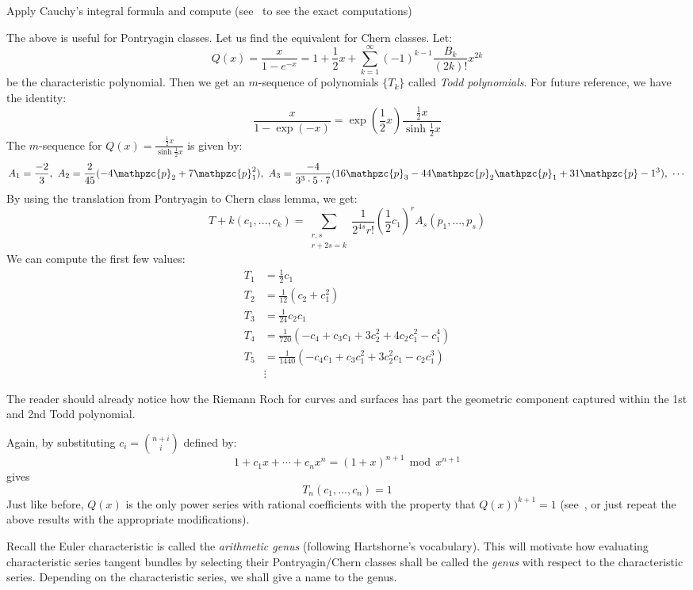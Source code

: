 \documentclass{ut-thesis}
\newenvironment{Proof}[1][]
  {\begin{ProofTcb}[#1]}
  {\end{ProofTcb}}
\newcommand{\cp}{{\mathpzc{p}}}
\renewcommand{\mod}{\,\operatorname{mod}\,}
\begin{document}
\begin{Proof}
  Apply Cauchy's integral formula and compute (see~\cite[p.12]{hirzebruchTopologicalMethodsAlgebraic1995} to
  see the exact computations)
\end{Proof}

The above is useful for Pontryagin classes. Let us find the equivalent for Chern classes. Let:
\[
  Q(x) = \frac{x}{1-e^{-x}} = 1 + \frac{1}{2}x + \sum_{k=1}^\infty (-1)^{k-1} \frac{B_k}{(2k)!}x^{2k}
\]
be the characteristic polynomial. Then we get an $m$-sequence of polynomials $\{T_k\}$ called \emph{Todd
polynomials}. For future reference, we have the identity:
\[
  \frac{x}{1-\exp(-x)} = \exp \left(\frac{1}{2}x\right) \frac{\frac{1}{2}x}{\sinh \frac{1}{2}x}
\]
The $m$-sequence for $Q(x) = \frac{\frac{1}{2}x}{\sinh \frac{1}{2}x}$ is given by:
\[
  A_1 = \frac{-2}{3},\ A_2 = \frac{2}{45}(-4\cp_2+7\cp_1^2),\  A_3 = \frac{-4}{3^3\cdot 5\cdot 7}(16\cp_3
  -44\cp_2\cp_1 + 31\cp-1^3),\ \cdots
\]
By using the translation from Pontryagin to Chern class lemma, we get:
\[
  T+k(c_1, ..., c_k) = \sum_{\substack{r,s\\r+2s=k}} \frac{1}{2^{4s}r!} \left(\frac{1}{2}c_1\right)^r A_s(p_1, ..., p_s)
\]
We can compute the first few values:
\begin{align*}
  T_1 &= \frac{1}{2}c_1\\
  T_2 &= \frac{1}{12} (c_2 + c_1^2)\\
  T_3 &= \frac{1}{24} c_2c_1\\
  T_4 &= \frac{1}{720} (-c_4 + c_3c_1 + 3c_2^2 + 4c_2c_1^2 - c_1^4)\\
  T_5 &= \frac{1}{1440} \left(-c_4c_1 + c_3c_1^2  +3c_2^2c_1 - c_2c_1^3\right) \\
      &\vdots
\end{align*}

The reader should already notice how the Riemann Roch for curves and surfaces has part the geometric
component captured within the 1st and 2nd Todd polynomial.

Again, by substituting $c_i = \binom{n+i}{i}$ defined by:
\[
  1 + c_1x + \cdots + c_nx^n = (1+x)^{n+1} \mod x^{n+1}
\]
gives
\[
  T_n(c_1, ..., c_n) = 1
\]
Just like before, $Q(x)$ is the only power series with rational coefficients with the property that
$Q(x))^{k+1} = 1$ (see~\cite[p.14]{hirzebruchTopologicalMethodsAlgebraic1995}, or just repeat the above
results with the appropriate modifications).

Recall the Euler characteristic is called the \emph{arithmetic genus} (following Hartshorne's vocabulary).
This will motivate how evaluating characteristic series tangent bundles by selecting their Pontryagin/Chern
classes shall be called the \emph{genus} with respect to the characteristic series. Depending on the
characteristic series, we shall give a name to the genus.
\end{document}
